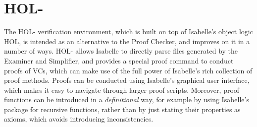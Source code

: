 \section{HOL-\SPARK{}}

The HOL-\SPARK{} verification environment, which is built on top of Isabelle's object
logic HOL, is intended as an alternative
to the \SPARK{} Proof Checker, and improves on it in a number of ways.
HOL-\SPARK{} allows Isabelle to directly parse files generated
by the Examiner and Simplifier, and provides a special proof command to conduct
proofs of VCs, which can make use of the full power of Isabelle's rich
collection of proof methods.
Proofs can be conducted using Isabelle's graphical user interface, which makes
it easy to navigate through larger proof scripts. Moreover, proof functions
can be introduced in a \emph{definitional} way, for example by using Isabelle's
package for recursive functions, rather than by just stating their properties as axioms,
which avoids introducing inconsistencies.

